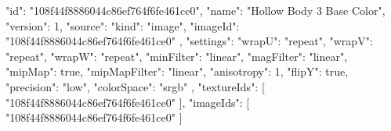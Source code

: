 {
  "id": "108f44f8886044c86ef764f6fe461ce0",
  "name": "Hollow Body 3 Base Color",
  "version": 1,
  "source": {
    "kind": "image",
    "imageId": "108f44f8886044c86ef764f6fe461ce0"
  },
  "settings": {
    "wrapU": "repeat",
    "wrapV": "repeat",
    "wrapW": "repeat",
    "minFilter": "linear",
    "magFilter": "linear",
    "mipMap": true,
    "mipMapFilter": "linear",
    "anisotropy": 1,
    "flipY": true,
    "precision": "low",
    "colorSpace": "srgb"
  },
  "textureIds": [
    "108f44f8886044c86ef764f6fe461ce0"
  ],
  "imageIds": [
    "108f44f8886044c86ef764f6fe461ce0"
  ]
}
